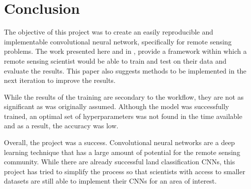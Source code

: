 \chapter{Conclusion}
The objective of this project was to create an easily reproducible and implementable convolutional neural network, specifically for remote sensing problems. The work presented here and in \citet{Richmond19b}, provide a framework within which a remote sensing scientist would be able to train and test on their data and evaluate the results. This paper also suggests methods to be implemented in the next iteration to improve the results. 
\par
While the results of the training are secondary to the workflow, they are not as significant as was originally assumed. Although the model was successfully trained, an optimal set of hyperparameters was not found in the time available and as a result, the accuracy was low.
\par
Overall, the project was a success. Convolutional neural networks are a deep learning technique that has a large amount of potential for the remote sensing community. While there are already successful land classification CNNs, this project has tried to simplify the process so that scientists with access to smaller datasets are still able to implement their CNNs for an area of interest.